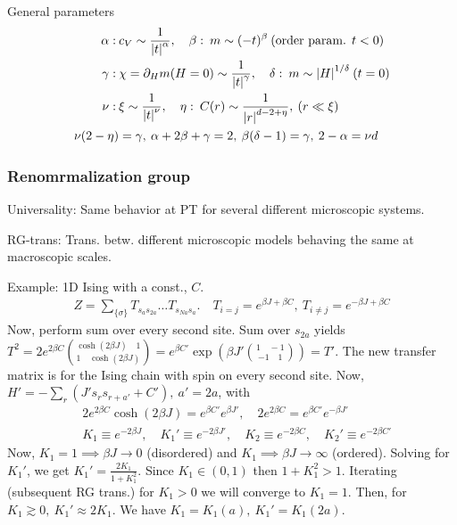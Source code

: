 \documentclass[a4paper, english, 12pt]{article}
\newcommand{\closed}[1]{\left( #1 \right)}
\newcommand{\curly}[1]{\{ #1 \} }
\begin{document}
\begin{multicols*}{2}
General parameters 
\begin{align*}
    \alpha:\: & c_V \sim \frac{1}{\abs{t}^\alpha},\quad \beta:\: m \sim (-t)^\beta\:(\text{order param. } t<0) \\ 
    \gamma:\:& \chi=\partial_H m(H=0) \sim \frac{1}{\abs{t}^\gamma},\quad \delta:\: m \sim \abs{H}^{1/\delta}\: (t=0) \\
    \nu:\: & \xi \sim \frac{1}{\abs{t}^\nu},\quad \eta:\: C(r) \sim \frac{1}{\abs{r}^{d-2+\eta}},\: (r\ll\xi) \\
    \nu(2-\eta) &= \gamma,\: \alpha + 2\beta + \gamma = 2,\: \beta(\delta-1) = \gamma,\: 2-\alpha = \nu d
\end{align*}


\subsubsection*{\scriptsize Renomrmalization group}
Universality: Same behavior at PT for several different microscopic systems. 

RG-trans: Trans. betw. different microscopic models behaving the same at macroscopic scales. 

Example: 1D Ising with a const., $C$. 
\begin{align*}
    Z = \sum_{\curly{\sigma}} T_{s_a s_{2a}}\dots T_{s_{Na} s_a}. \quad T_{i=j}=e^{\beta J + \beta C},\:T_{i\neq j}=e^{-\beta J +\beta C}
\end{align*}
Now, perform sum over every second site. Sum over $s_{2a}$ yields $T^2=2e^{2\beta C} \binom{\cosh(2\beta J)\quad 1}{1\quad \cosh(2\beta J)}=e^{\beta C'} \exp\closed{\beta J'\binom{1 \quad -1}{-1 \quad 1}}=T'$. The new transfer matrix is for the Ising chain with spin on every second site. Now, $H'=-\sum_r (J' s_r s_{r+a'}+C'),\:a'=2a$, with 
\begin{align*}
    &2e^{2\beta C} \cosh(2\beta J) = e^{\beta C'} e^{\beta J'},\quad 2e^{2\beta C}=e^{\beta C'} e^{-\beta J'} \\ 
    &K_1 \equiv e^{-2\beta J},\quad K_1' \equiv e^{-2\beta J'},\quad K_2 \equiv e^{-2\beta C},\quad K_2' \equiv e^{-2\beta C'}
\end{align*} 
Now, $K_1=1\implies \beta J\to 0$ (disordered) and $K_1\implies \beta J\to\infty$ (ordered). Solving for $K_1'$, we get $K_1'=\frac{2K_1}{1+K_1^2}$. Since $K_1\in(0,1)$ then $1+K_1^2>1$. Iterating (subsequent RG trans.) for $K_1>0$ we will converge to $K_1=1$. Then, for $K_1\gtrsim0,\:K_1'\approx 2K_1$. We have $K_1=K_1(a),\: K_1'=K_1(2a)$. 


\end{multicols*}
\end{document}
